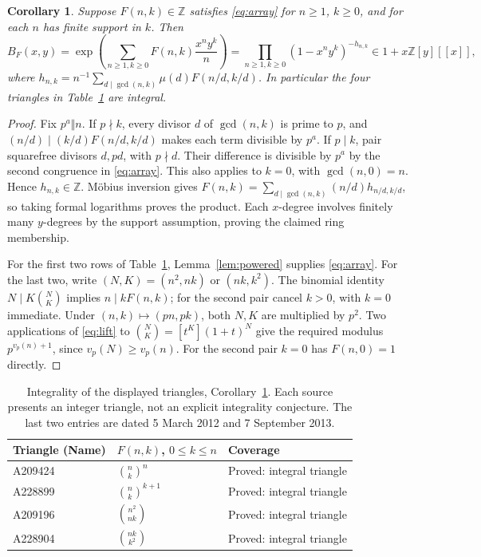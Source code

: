 \documentclass[11pt]{article}
\newtheorem{corollary}[theorem]{Corollary}
\begin{document}
\begin{corollary}\label{cor:bivariate}
Suppose $F(n,k)\in\mathbb Z$ satisfies \eqref{eq:array} for $n\ge1$, $k\ge0$,
and for each $n$ has finite support in $k$. Then
\[
 B_F(x,y)=\exp\left(\sum_{n\ge1,k\ge0}F(n,k)\frac{x^ny^k}{n}\right)
 =\prod_{n\ge1,k\ge0}(1-x^ny^k)^{-h_{n,k}}
 \in1+x\mathbb Z[y][[x]],
\]
where $h_{n,k}=n^{-1}\sum_{d\mid\gcd(n,k)}\mu(d)F(n/d,k/d)$.
In particular the four triangles in Table~\ref{tab:bivariate} are integral.
\end{corollary}
\begin{proof}
Fix $p^a\Vert n$. If $p\nmid k$, every divisor $d$ of $\gcd(n,k)$
is prime to $p$, and $(n/d)\mid(k/d)F(n/d,k/d)$ makes each term
divisible by $p^a$. If $p\mid k$, pair squarefree divisors $d,pd$,
with $p\nmid d$. Their difference is divisible by $p^a$ by the second
congruence in \eqref{eq:array}. This also applies to $k=0$, with
$\gcd(n,0)=n$. Hence $h_{n,k}\in\mathbb Z$. M\"obius inversion gives
$F(n,k)=\sum_{d\mid\gcd(n,k)}(n/d)h_{n/d,k/d}$, so taking formal
logarithms proves the product. Each $x$-degree involves finitely many
$y$-degrees by the support assumption, proving the claimed ring membership.

For the first two rows of Table~\ref{tab:bivariate},
Lemma~\ref{lem:powered} supplies \eqref{eq:array}. For the last two,
write $(N,K)=(n^2,nk)$ or $(nk,k^2)$. The binomial identity
$N\mid K\binom NK$ implies $n\mid kF(n,k)$; for the second pair
cancel $k>0$, with $k=0$ immediate. Under $(n,k)\mapsto(pn,pk)$,
both $N,K$ are multiplied by $p^2$. Two applications of
\eqref{eq:lift} to $\binom NK=[t^K](1+t)^N$ give the required
modulus $p^{v_p(n)+1}$, since $v_p(N)\ge v_p(n)$.
For the second pair $k=0$ has $F(n,0)=1$ directly.
\end{proof}

\begin{table}[ht]\centering\small
\begin{tabular}{@{}lll@{}}
\toprule
Triangle (Name) & $F(n,k)$, $0\le k\le n$ & Coverage\\
\midrule
A209424 & $\binom nk^n$ & Proved: integral triangle\\
A228899 & $\binom nk^{k+1}$ & Proved: integral triangle\\
A209196 & $\binom{n^2}{nk}$ & Proved: integral triangle\\
A228904 & $\binom{nk}{k^2}$ & Proved: integral triangle\\
\bottomrule
\end{tabular}
\caption{Integrality of the displayed triangles, Corollary~\ref{cor:bivariate}.
Each source presents an integer triangle, not an explicit integrality
conjecture. The last two entries are dated 5 March 2012 and
7 September 2013.}\label{tab:bivariate}
\end{table}
\end{document}
